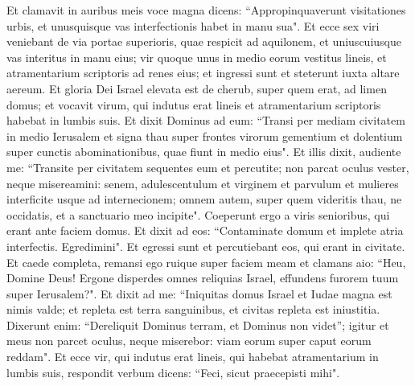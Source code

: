 \begin{biblechapter}  
\verse Et clamavit in auribus meis voce magna dicens: “Appropinquaverunt visitationes urbis, et unusquisque vas interfectionis habet in manu sua". 
\verse Et ecce sex viri veniebant de via portae superioris, quae respicit ad aquilonem, et uniuscuiusque vas interitus in manu eius; vir quoque unus in medio eorum vestitus lineis, et atramentarium scriptoris ad renes eius; et ingressi sunt et steterunt iuxta altare aereum. 
\verse Et gloria Dei Israel elevata est de cherub, super quem erat, ad limen domus; et vocavit virum, qui indutus erat lineis et atramentarium scriptoris habebat in lumbis suis. 
\verse Et dixit Dominus ad eum: “Transi per mediam civitatem in medio Ierusalem et signa thau super frontes virorum gementium et dolentium super cunctis abominationibus, quae fiunt in medio eius". 
\verse Et illis dixit, audiente me: “Transite per civitatem sequentes eum et percutite; non parcat oculus vester, neque misereamini: 
\verse senem, adulescentulum et virginem et parvulum et mulieres interficite usque ad internecionem; omnem autem, super quem videritis thau, ne occidatis, et a sanctuario meo incipite". Coeperunt ergo a viris senioribus, qui erant ante faciem domus. 
\verse Et dixit ad eos: “Contaminate domum et implete atria interfectis. Egredimini". Et egressi sunt et percutiebant eos, qui erant in civitate. 
\verse Et caede completa, remansi ego ruique super faciem meam et clamans aio: “Heu, Domine Deus! Ergone disperdes omnes reliquias Israel, effundens furorem tuum super Ierusalem?". 
\verse Et dixit ad me: “Iniquitas domus Israel et Iudae magna est nimis valde; et repleta est terra sanguinibus, et civitas repleta est iniustitia. Dixerunt enim: “Dereliquit Dominus terram, et Dominus non videt”; 
\verse igitur et meus non parcet oculus, neque miserebor: viam eorum super caput eorum reddam". 
\verse Et ecce vir, qui indutus erat lineis, qui habebat atramentarium in lumbis suis, respondit verbum dicens: “Feci, sicut praecepisti mihi". 
\end{biblechapter}

